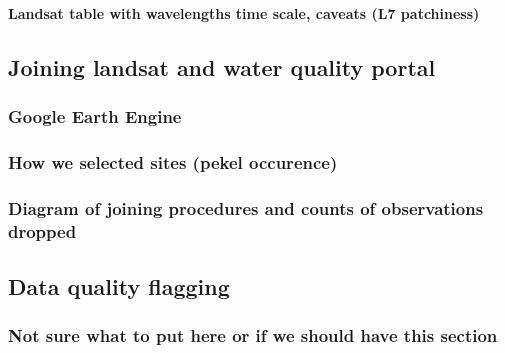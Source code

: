 \documentclass[]{article}
\let\oldparagraph\paragraph
\renewcommand{\paragraph}[1]{\oldparagraph{#1}\mbox{}}
\begin{document}
\hypertarget{landsat-table-with-wavelengths-time-scale-caveats-l7-patchiness}{%
\paragraph{Landsat table with wavelengths time scale, caveats (L7
patchiness)}\label{landsat-table-with-wavelengths-time-scale-caveats-l7-patchiness}}

\hypertarget{joining-landsat-and-water-quality-portal}{%
\subsection{Joining landsat and water quality
portal}\label{joining-landsat-and-water-quality-portal}}

\hypertarget{google-earth-engine}{%
\subsubsection{Google Earth Engine}\label{google-earth-engine}}

\hypertarget{how-we-selected-sites-pekel-occurence}{%
\subsubsection{How we selected sites (pekel
occurence)}\label{how-we-selected-sites-pekel-occurence}}

\hypertarget{diagram-of-joining-procedures-and-counts-of-observations-dropped}{%
\subsubsection{Diagram of joining procedures and counts of observations
dropped}\label{diagram-of-joining-procedures-and-counts-of-observations-dropped}}

\hypertarget{data-quality-flagging}{%
\subsection{Data quality flagging}\label{data-quality-flagging}}

\hypertarget{not-sure-what-to-put-here-or-if-we-should-have-this-section}{%
\subsubsection{Not sure what to put here or if we should have this
section}\label{not-sure-what-to-put-here-or-if-we-should-have-this-section}}
\end{document}

